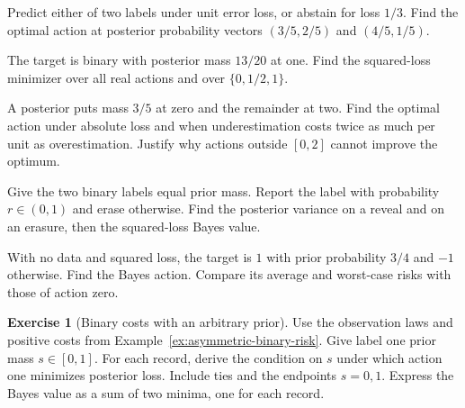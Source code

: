 \documentclass[11pt,oneside]{book}
\theoremstyle{definition}
\newtheorem{exercise}{Exercise}[section]
\theoremstyle{remark}
\begin{document}
\begin{practiceexercise}
\label{wex:reject-option}
Predict either of two labels under unit error loss, or abstain for loss
$1/3$. Find the optimal action at posterior probability vectors $(3/5,2/5)$
and $(4/5,1/5)$.
\end{practiceexercise}

\begin{practiceexercise}
\label{wex:grid-constrained-posterior-mean}
The target is binary with posterior mass $13/20$ at one. Find the
squared-loss minimizer over all real actions and over $\{0,1/2,1\}$.
\end{practiceexercise}

\begin{practiceexercise}
\label{wex:asymmetric-absolute-posterior}
A posterior puts mass $3/5$ at zero and the remainder at two. Find the
optimal action under absolute loss and when underestimation costs twice as
much per unit as overestimation. Justify why actions outside $[0,2]$ cannot
improve the optimum.
\end{practiceexercise}

\begin{practiceexercise}
\label{wex:erasure-bayes-value}
Give the two binary labels equal prior mass. Report the label with
probability $r\in(0,1)$ and erase otherwise. Find the posterior variance on
a reveal and on an erasure, then the squared-loss Bayes value.
\end{practiceexercise}

\begin{practiceexercise}
\label{wex:unequal-prior-risk-tradeoff}
With no data and squared loss, the target is $1$ with prior probability
$3/4$ and $-1$ otherwise. Find the Bayes action. Compare its average and
worst-case risks with those of action zero.
\end{practiceexercise}

\begin{exercise}[Binary costs with an arbitrary prior]
\label{exer:binary-bayes-threshold}
Use the observation laws and positive costs from
Example~\ref{ex:asymmetric-binary-risk}. Give label one prior mass
$s\in[0,1]$. For each record, derive the condition on $s$ under which
action one minimizes posterior loss. Include ties and the endpoints
$s=0,1$. Express the Bayes value as a sum of two minima, one for each
record.
\end{exercise}
\end{document}
